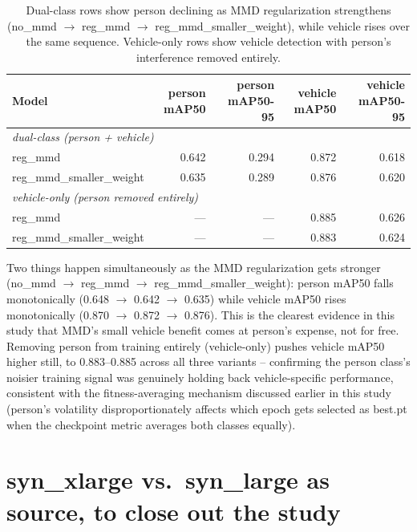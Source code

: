 \documentclass[11pt]{article}
\begin{document}
\begin{table}[h!]
    \centering
    \setlength{\tabcolsep}{5pt}
    \begin{tabular}{lrrrr}
        \toprule
        Model & person mAP50 & person mAP50-95 & vehicle mAP50 & vehicle mAP50-95 \\
        \midrule
        \multicolumn{5}{l}{\textit{dual-class (person + vehicle)}} \\
        reg\_mmd & 0.642 & 0.294 & 0.872 & 0.618 \\
        reg\_mmd\_smaller\_weight & 0.635 & 0.289 & 0.876 & 0.620 \\
        \midrule
        \multicolumn{5}{l}{\textit{vehicle-only (person removed entirely)}} \\
        reg\_mmd & --- & --- & 0.885 & 0.626 \\
        reg\_mmd\_smaller\_weight & --- & --- & 0.883 & 0.624 \\
        \bottomrule
    \end{tabular}
    \caption{Dual-class rows show person declining as MMD regularization strengthens
    (no\_mmd $\to$ reg\_mmd $\to$ reg\_mmd\_smaller\_weight), while vehicle rises over
    the same sequence. Vehicle-only rows show vehicle detection with person's
    interference removed entirely.}
\end{table}

\noindent Two things happen simultaneously as the MMD regularization gets stronger
(no\_mmd $\to$ reg\_mmd $\to$ reg\_mmd\_smaller\_weight): person mAP50 falls
monotonically (0.648 $\to$ 0.642 $\to$ 0.635) while vehicle mAP50 rises monotonically
(0.870 $\to$ 0.872 $\to$ 0.876). This is the clearest evidence in this study that MMD's
small vehicle benefit comes at person's expense, not for free. Removing person from
training entirely (vehicle-only) pushes vehicle mAP50 higher still, to 0.883--0.885
across all three variants -- confirming the person class's noisier training signal
was genuinely holding back vehicle-specific performance, consistent with the
fitness-averaging mechanism discussed earlier in this study (person's volatility
disproportionately affects which epoch gets selected as best.pt when the checkpoint
metric averages both classes equally).

\section{syn\_xlarge vs.\ syn\_large as source, to close out the study}
\end{document}
